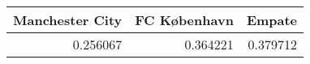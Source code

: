 \begin{tabular}{rrr}
\hline
   Manchester City &   FC København &   Empate \\
\hline
          0.256067 &       0.364221 & 0.379712 \\
\hline
\end{tabular}